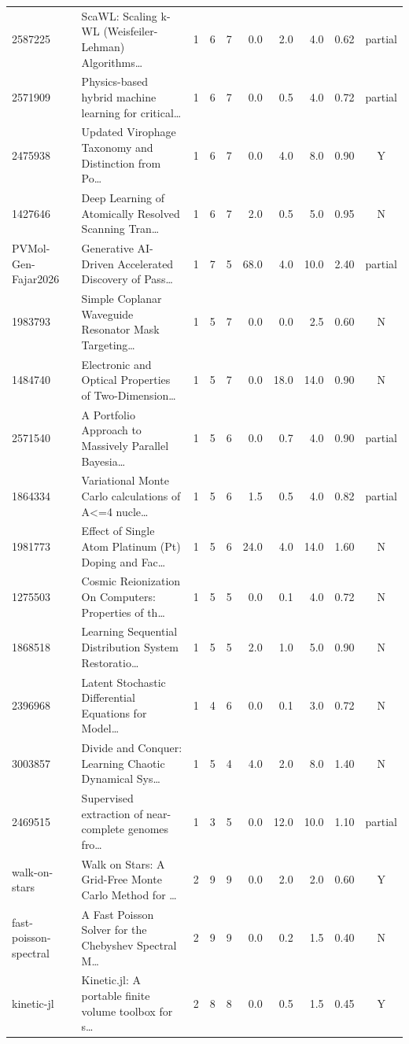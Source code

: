 \documentclass[11pt,letterpaper]{article}
\begin{document}
\begin{landscape}
\begin{longtable}{p{2.6cm}p{6.0cm}c c c r r r r c}
2587225 & ScaWL: Scaling k-WL (Weisfeiler-Lehman) Algorithms… & 1 & 6 & 7 & 0.0 & 2.0 & 4.0 & 0.62 & partial \\
2571909 & Physics-based hybrid machine learning for critical… & 1 & 6 & 7 & 0.0 & 0.5 & 4.0 & 0.72 & partial \\
2475938 & Updated Virophage Taxonomy and Distinction from Po… & 1 & 6 & 7 & 0.0 & 4.0 & 8.0 & 0.90 & Y \\
1427646 & Deep Learning of Atomically Resolved Scanning Tran… & 1 & 6 & 7 & 2.0 & 0.5 & 5.0 & 0.95 & N \\
PVMol-Gen-Fajar2026 & Generative AI-Driven Accelerated Discovery of Pass… & 1 & 7 & 5 & 68.0 & 4.0 & 10.0 & 2.40 & partial \\
1983793 & Simple Coplanar Waveguide Resonator Mask Targeting… & 1 & 5 & 7 & 0.0 & 0.0 & 2.5 & 0.60 & N \\
1484740 & Electronic and Optical Properties of Two-Dimension… & 1 & 5 & 7 & 0.0 & 18.0 & 14.0 & 0.90 & N \\
2571540 & A Portfolio Approach to Massively Parallel Bayesia… & 1 & 5 & 6 & 0.0 & 0.7 & 4.0 & 0.90 & partial \\
1864334 & Variational Monte Carlo calculations of A<=4 nucle… & 1 & 5 & 6 & 1.5 & 0.5 & 4.0 & 0.82 & partial \\
1981773 & Effect of Single Atom Platinum (Pt) Doping and Fac… & 1 & 5 & 6 & 24.0 & 4.0 & 14.0 & 1.60 & N \\
1275503 & Cosmic Reionization On Computers: Properties of th… & 1 & 5 & 5 & 0.0 & 0.1 & 4.0 & 0.72 & N \\
1868518 & Learning Sequential Distribution System Restoratio… & 1 & 5 & 5 & 2.0 & 1.0 & 5.0 & 0.90 & N \\
2396968 & Latent Stochastic Differential Equations for Model… & 1 & 4 & 6 & 0.0 & 0.1 & 3.0 & 0.72 & N \\
3003857 & Divide and Conquer: Learning Chaotic Dynamical Sys… & 1 & 5 & 4 & 4.0 & 2.0 & 8.0 & 1.40 & N \\
2469515 & Supervised extraction of near-complete genomes fro… & 1 & 3 & 5 & 0.0 & 12.0 & 10.0 & 1.10 & partial \\
walk-on-stars & Walk on Stars: A Grid-Free Monte Carlo Method for … & 2 & 9 & 9 & 0.0 & 2.0 & 2.0 & 0.60 & Y \\
fast-poisson-spectral & A Fast Poisson Solver for the Chebyshev Spectral M… & 2 & 9 & 9 & 0.0 & 0.2 & 1.5 & 0.40 & N \\
kinetic-jl & Kinetic.jl: A portable finite volume toolbox for s… & 2 & 8 & 8 & 0.0 & 0.5 & 1.5 & 0.45 & Y \\

\end{longtable}
\end{landscape}
\end{document}

